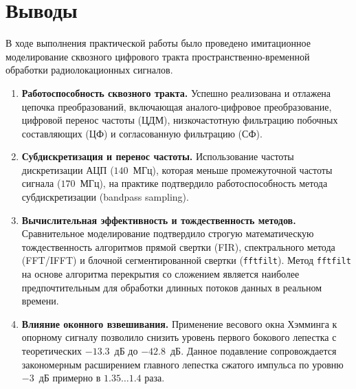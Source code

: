 \section{Выводы}
В ходе выполнения практической работы было проведено имитационное моделирование сквозного цифрового тракта пространственно-временной обработки радиолокационных сигналов.

\begin{enumerate}
    \item \textbf{Работоспособность сквозного тракта.} Успешно реализована и отлажена цепочка преобразований, включающая аналого-цифровое преобразование, цифровой перенос частоты (ЦДМ), низкочастотную фильтрацию побочных составляющих (ЦФ) и согласованную фильтрацию (СФ).
    \item \textbf{Субдискретизация и перенос частоты.} Использование частоты дискретизации АЦП ($140$~МГц), которая меньше промежуточной частоты сигнала ($170$~МГц), на практике подтвердило работоспособность метода субдискретизации (bandpass sampling).
    \item \textbf{Вычислительная эффективность и тождественность методов.} Сравнительное моделирование подтвердило строгую математическую тождественность алгоритмов прямой свертки (FIR), спектрального метода (FFT/IFFT) и блочной сегментированной свертки (\texttt{fftfilt}). Метод \texttt{fftfilt} на основе алгоритма перекрытия со сложением является наиболее предпочтительным для обработки длинных потоков данных в реальном времени.
    \item \textbf{Влияние оконного взвешивания.} Применение весового окна Хэмминга к опорному сигналу позволило снизить уровень первого бокового лепестка с теоретических $-13.3$~дБ до $-42.8$~дБ. Данное подавление сопровождается закономерным расширением главного лепестка сжатого импульса по уровню $-3$~дБ примерно в $1.35 \dots 1.4$ раза.
\end{enumerate}